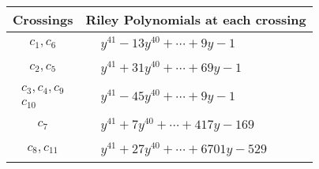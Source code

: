 \documentclass[1p]{elsarticle_modified}
\theoremstyle{definition}
\begin{document}
\begin{tabular}{m{50pt}|m{274pt}}
Crossings & \hspace{64pt}Riley Polynomials at each crossing \\
\hline $$\begin{aligned}c_{1},c_{6}\end{aligned}$$&$\begin{aligned}
&y^{41}-13 y^{40}+\cdots+9 y-1
\end{aligned}$\\
\hline $$\begin{aligned}c_{2},c_{5}\end{aligned}$$&$\begin{aligned}
&y^{41}+31 y^{40}+\cdots+69 y-1
\end{aligned}$\\
\hline $$\begin{aligned}c_{3},c_{4},c_{9}\\c_{10}\end{aligned}$$&$\begin{aligned}
&y^{41}-45 y^{40}+\cdots+9 y-1
\end{aligned}$\\
\hline $$\begin{aligned}c_{7}\end{aligned}$$&$\begin{aligned}
&y^{41}+7 y^{40}+\cdots+417 y-169
\end{aligned}$\\
\hline $$\begin{aligned}c_{8},c_{11}\end{aligned}$$&$\begin{aligned}
&y^{41}+27 y^{40}+\cdots+6701 y-529
\end{aligned}$\\
\hline
\end{tabular}
\vskip 2pc
\end{document}
